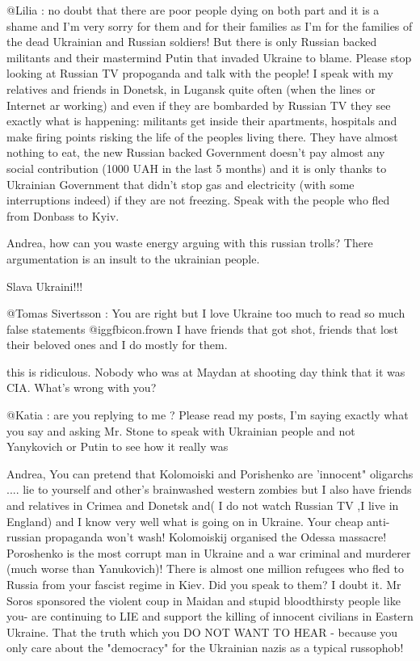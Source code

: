 \begin{itemize}
\begin{itemize}

@Lilia : no doubt that there are poor people dying on both part and it is a
shame and I'm very sorry for them and for their families as I'm for the
families of the dead Ukrainian and Russian soldiers! But there is only Russian
backed militants and their mastermind Putin that invaded Ukraine to blame.
Please stop looking at Russian TV propoganda and talk with the people! I speak
with my relatives and friends in Donetsk, in Lugansk quite often (when the
lines or Internet ar working) and even if they are bombarded by Russian TV they
see exactly what is happening: militants get inside their apartments, hospitals
and make firing points risking the life of the peoples living there. They have
almost nothing to eat, the new Russian backed Government doesn't pay almost any
social contribution (1000 UAH in the last 5 months) and it is only thanks to
Ukrainian Government that didn't stop gas and electricity (with some
interruptions indeed) if they are not freezing. Speak with the people who fled
from Donbass to Kyiv.


Andrea, how can you waste energy arguing with this russian trolls? There
argumentation is an insult to the ukrainian people.

Slava Ukraini!!!


@Tomas Sivertsson : You are right but I love Ukraine too much to read so much
false statements  @igg{fbicon.frown}  I have friends that got shot, friends that lost their
beloved ones and I do mostly for them.


this is ridiculous. Nobody who was at Maydan at shooting day think that it was CIA. What's wrong with you?


@Katia : are you replying to me ? Please read my posts, I'm saying exactly what
you say and asking Mr. Stone to speak with Ukrainian people and not Yanykovich
or Putin to see how it really was


Andrea, You can pretend that Kolomoiski and Porishenko are 'innocent" oligarchs
.... lie to yourself and other's brainwashed western zombies but I also have
friends and relatives in Crimea and Donetsk and( I do not watch Russian TV ,I
live in England) and I know very well what is going on in Ukraine. Your cheap
anti-russian propaganda won't wash! Kolomoiskij organised the Odessa massacre!
Poroshenko is the most corrupt man in Ukraine and a war criminal and murderer
(much worse than Yanukovich)! There is almost one million refugees who fled to
Russia from your fascist regime in Kiev. Did you speak to them? I doubt it. Mr
Soros sponsored the violent coup in Maidan and stupid bloodthirsty people like
you- are continuing to LIE and support the killing of innocent civilians in
Eastern Ukraine. That the truth which you DO NOT WANT TO HEAR - because you
only care about the "democracy" for the Ukrainian nazis as a typical russophob!


\end{itemize}
\end{itemize}
